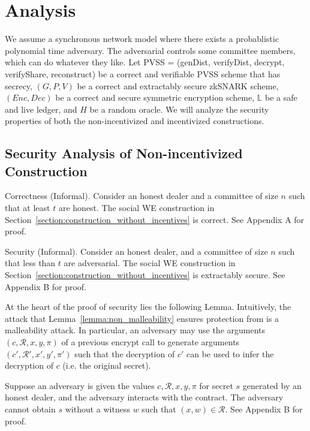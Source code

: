 \section{Analysis}
We assume a synchronous network model where there exists a probablistic polynomial time adversary.
The adversarial controls some committee members, which can do whatever they like.
Let \textsf{PVSS} = (\textsf{genDist}, \textsf{verifyDist}, \textsf{decrypt}, \textsf{verifyShare}, \textsf{reconstruct}) be a correct and verifiable PVSS scheme that has secrecy,
$(G, P, V)$ be a correct and extractably secure zkSNARK scheme, $(Enc, Dec)$ be a correct and secure symmetric encryption scheme,
$\mathbb{L}$ be a safe and live ledger, and $H$ be a random oracle.
We will analyze the security properties of both the non-incentivized and incentivized constructions.

\subsection{Security Analysis of Non-incentivized Construction}
\begin{theorem}{Correctness (Informal).}\label{thm:correctness_hm}
    Consider an honest dealer and a committee of size $n$ such that at least $t$ are honest.
    The social WE construction in Section~\ref{section:construction_without_incentives} is correct.
    See Appendix A for proof.
\end{theorem}

\begin{theorem}{Security (Informal).}\label{thm:security_hm}
    Consider an honest dealer, and a committee of size $n$ such that less than $t$ are adversarial.
    The social WE construction in Section~\ref{section:construction_without_incentives} is extractably secure.
    See Appendix B for proof.
\end{theorem}

At the heart of the proof of security lies the following Lemma.
Intuitively, the attack that Lemma~\ref{lemma:non_malleability} ensures protection from is a malleability attack.
In particular, an adversary may use the arguments $(c, \mathcal{R}, x, y, \pi)$ of a previous \textsf{encrypt} call to generate arguments $(c', \mathcal{R}', x', y', \pi')$ such that the decryption of $c'$ can be used to infer the decryption of $c$ (i.e. the original secret).

\begin{lemma}\label{lemma:non_malleability}
    Suppose an adversary is given the values $c, \mathcal{R}, x, y, \pi$ for secret $s$ generated by an honest dealer, and the adversary interacts with the contract.
    The adversary cannot obtain $s$ without a witness $w$ such that $(x, w) \in \mathcal{R}$. See Appendix B for proof.
\end{lemma}


